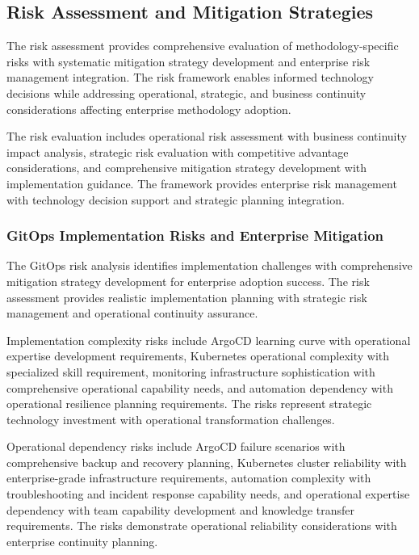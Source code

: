 
\subsection{Risk Assessment and Mitigation Strategies}
\label{subsec:risk_assessment}

The risk assessment provides comprehensive evaluation of methodology-specific risks with systematic mitigation strategy development and enterprise risk management integration. The risk framework enables informed technology decisions while addressing operational, strategic, and business continuity considerations affecting enterprise methodology adoption.

The risk evaluation includes operational risk assessment with business continuity impact analysis, strategic risk evaluation with competitive advantage considerations, and comprehensive mitigation strategy development with implementation guidance. The framework provides enterprise risk management with technology decision support and strategic planning integration.

\subsubsection{GitOps Implementation Risks and Enterprise Mitigation}

The GitOps risk analysis identifies implementation challenges with comprehensive mitigation strategy development for enterprise adoption success. The risk assessment provides realistic implementation planning with strategic risk management and operational continuity assurance.

Implementation complexity risks include ArgoCD learning curve with operational expertise development requirements, Kubernetes operational complexity with specialized skill requirement, monitoring infrastructure sophistication with comprehensive operational capability needs, and automation dependency with operational resilience planning requirements. The risks represent strategic technology investment with operational transformation challenges.

Operational dependency risks include ArgoCD failure scenarios with comprehensive backup and recovery planning, Kubernetes cluster reliability with enterprise-grade infrastructure requirements, automation complexity with troubleshooting and incident response capability needs, and operational expertise dependency with team capability development and knowledge transfer requirements. The risks demonstrate operational reliability considerations with enterprise continuity planning.

